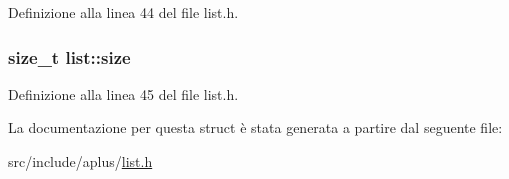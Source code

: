 Definizione alla linea 44 del file list.\+h.

\hypertarget{structlist_ae581be90bd8eb7051528b61ad216de88}{
\subsubsection[{size}]{\setlength{\rightskip}{0pt plus 5cm}size\+\_\+t list\+::size}}\label{structlist_ae581be90bd8eb7051528b61ad216de88}


Definizione alla linea 45 del file list.\+h.



La documentazione per questa struct è stata generata a partire dal seguente file\+:\begin{DoxyCompactItemize}
\item 
src/include/aplus/\hyperlink{list_8h}{list.\+h}\end{DoxyCompactItemize}
